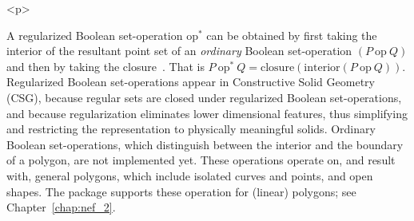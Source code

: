 \begin{ccHtmlOnly}<p>\end{ccHtmlOnly}
A regularized Boolean set-operation $\mbox{op}^*$ can be obtained by
first taking the interior of the resultant point set of an {\em ordinary}
Boolean set-operation $(P\ \mbox{op}\ Q)$ and then by taking the
closure~\cite{cgal:h-sm-04}. That is
$P\ \mbox{op}^*\ Q = \mbox{closure}(\mbox{interior} (P\ \mbox{op}\ Q))$.
Regularized Boolean set-operations appear in Constructive Solid
Geometry (CSG), because regular sets are closed under regularized
Boolean set-operations, and because regularization eliminates lower
dimensional features, thus simplifying and restricting the
representation to physically meaningful solids.
Ordinary Boolean set-operations, which distinguish between the
interior and the boundary of a polygon, are not implemented yet. These
operations operate on, and result with, general polygons, which
include isolated curves and points, and open shapes. The 
package supports these operation for (linear) polygons; see
Chapter~\ref{chap:nef_2}. 

